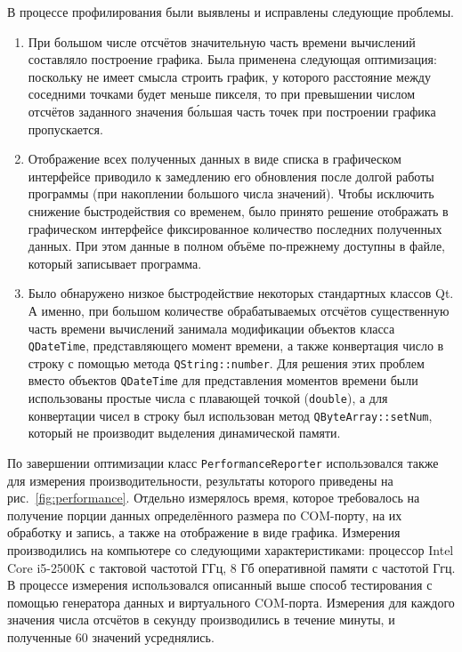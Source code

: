 \documentclass[a4paper, 14pt, titlepage]{extarticle}
\newcommand{\inlinecode}[1]{\lstinline[basicstyle=\ttfamily]{#1}}
\newcommand{\eng}[1]{\foreignlanguage{english}{#1}}
\begin{document}
  В процессе профилирования были выявлены и исправлены следующие проблемы.
  \begin{enumerate}
    \item При большом числе отсчётов значительную часть времени вычислений составляло построение
      графика. Была применена следующая оптимизация: поскольку не имеет смысла строить график, у которого расстояние между соседними
      точками будет меньше пикселя, то при превышении числом отсчётов заданного значения
      б\'{о}льшая часть точек при построении графика пропускается.
    \item Отображение всех полученных данных в виде списка в графическом интерфейсе приводило к
      замедлению его обновления после долгой работы программы (при накоплении большого числа
      значений). Чтобы исключить снижение быстродействия со временем, было принято решение
      отображать в графическом интерфейсе фиксированное количество последних полученных данных. При
      этом данные в полном объёме по-прежнему доступны в файле, который записывает программа.
    \item Было обнаружено низкое быстродействие некоторых стандартных классов Qt. А именно, при
      большом количестве обрабатываемых отсчётов существенную часть времени вычислений занимала
      модификации объектов класса \inlinecode{QDateTime}, представляющего момент времени, а также
      конвертация число в строку с помощью метода \inlinecode{QString::number}. Для решения этих
      проблем вместо объектов \inlinecode{QDateTime} для представления моментов времени были
      использованы простые числа с плавающей точкой (\inlinecode{double}), а для конвертации чисел в
      строку был использован метод \inlinecode{QByteArray::setNum}, который не производит выделения
      динамической памяти.
  \end{enumerate}

  По завершении оптимизации класс \inlinecode{PerformanceReporter} использовался также для измерения
  производительности, результаты которого приведены на рис.~\ref{fig:performance}. Отдельно
  измерялось время, которое требовалось на получение порции данных определённого размера по
  COM-порту, на их обработку и запись, а также на отображение в виде графика. Измерения
  производились на компьютере со следующими характеристиками: процессор \eng{Intel Core i5-2500K} с
  тактовой частотой  ГГц, 8 Гб оперативной памяти с частотой  Ггц. В процессе измерения использовался
  описанный выше способ тестирования с помощью генератора данных и виртуального COM-порта.
  Измерения для каждого значения числа отсчётов в секунду производились в течение минуты, и
  полученные 60 значений усреднялись.
\end{document}
